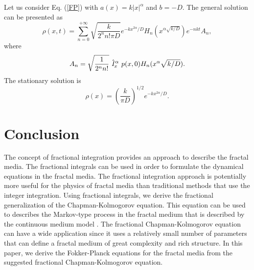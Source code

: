\documentclass[12pt]{article}
\begin{document}
Let us consider Eq. (\ref{FP})
with $a(x)=k|x|^{\alpha}$ and $b=-D$. 
The general solution  can be presented as
\[ \rho(x,t)=\sum^{+\infty}_{n=0}
\sqrt{\frac{k}{2^n n!\pi D}} e^{-k x^{2\alpha}/ D} 
H_n(x^{\alpha \sqrt{k/ D}}) e^{-nkt} A_n , \]
where
\[ A_n=\sqrt{\frac{1}{2^n n!}}\  \hat {\it I}^{\alpha}_x \ p(x,0) 
H_n(x^{\alpha}\sqrt{k/ D}) . \]
The stationary solution is
\[\rho(x)=\left(\frac{k}{\pi D}\right)^{1/2} e^{-k x^{2\alpha}/ D} . \]

\section{Conclusion}


The concept of fractional integration
provides an approach to describe the fractal media. 
The fractional integrals can be used in order to formulate  
the dynamical equations in the fractal media. 
The fractional integration approach is potentially more useful 
for the physics of fractal media than traditional methods that 
use the integer integration.
Using fractional integrals, 
we derive the fractional generalization of the 
Chapman-Kolmogorov equation.
This equation can be used to describes the Markov-type process 
in the fractal medium 
that is described by the continuous medium model \cite{Media}. 
The fractional Chapman-Kolmogorov equation can have 
a wide application since it uses 
a relatively small number of parameters that can define 
a fractal medium of great complexity and rich structure.
In this paper, we derive the Fokker-Planck equations 
for the fractal media from the suggested 
fractional Chapman-Kolmogorov equation.
\end{document}
